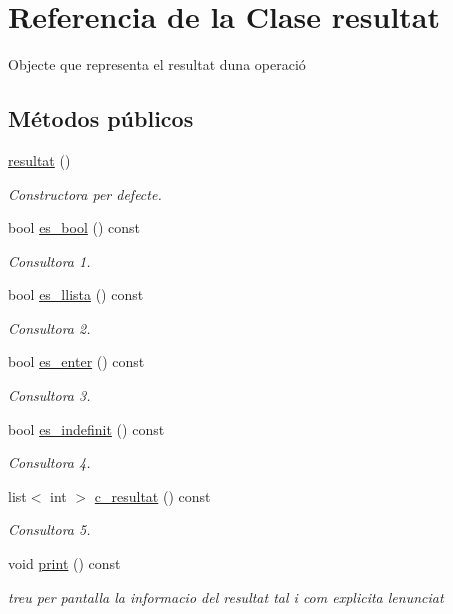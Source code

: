 \hypertarget{classresultat}{}\section{Referencia de la Clase resultat}
\label{classresultat}


Objecte que representa el resultat d\textquotesingle{}una operació  


\subsection*{Métodos públicos}
\begin{DoxyCompactItemize}
\item 
\hyperlink{classresultat_a536c47bd86857e3f5bfb26e156cb1877}{resultat} ()
\begin{DoxyCompactList}\small\item\em Constructora per defecte. \end{DoxyCompactList}\item 
bool \hyperlink{classresultat_a3ed548d73663ca956ac2f087c400abe6}{es\+\_\+bool} () const
\begin{DoxyCompactList}\small\item\em Consultora 1. \end{DoxyCompactList}\item 
bool \hyperlink{classresultat_a38e2b83a0bac16445b80e553321d1a61}{es\+\_\+llista} () const
\begin{DoxyCompactList}\small\item\em Consultora 2. \end{DoxyCompactList}\item 
bool \hyperlink{classresultat_a6d111168a77585236466639eb058a1bf}{es\+\_\+enter} () const
\begin{DoxyCompactList}\small\item\em Consultora 3. \end{DoxyCompactList}\item 
bool \hyperlink{classresultat_a82069f4c30872bf0129366d4d998a788}{es\+\_\+indefinit} () const
\begin{DoxyCompactList}\small\item\em Consultora 4. \end{DoxyCompactList}\item 
list$<$ int $>$ \hyperlink{classresultat_ada9590460dcd2d077f48bc3e10ec529e}{c\+\_\+resultat} () const
\begin{DoxyCompactList}\small\item\em Consultora 5. \end{DoxyCompactList}\item 
void \hyperlink{classresultat_adaa9aa55a0a9891a24f7dc04c4c1ebf2}{print} () const
\begin{DoxyCompactList}\small\item\em treu per pantalla la informacio del resultat tal i com explicita l\textquotesingle{}enunciat \end{DoxyCompactList}\end{DoxyCompactItemize}


